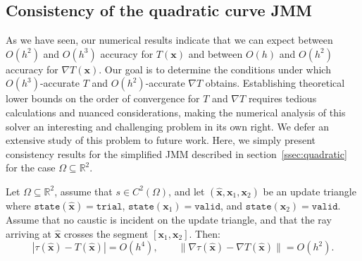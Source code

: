 \documentclass{siamart190516}
\newcommand{\m}[1]{\boldsymbol{#1}}
\newcommand{\state}{\texttt{state}}
\newcommand{\valid}{\texttt{valid}}
\newcommand{\trial}{\texttt{trial}}
\newcommand{\xhat}{\hat{\m{x}}}
\begin{document}
\subsection{Consistency of the quadratic curve JMM}

As we have seen, our numerical results indicate that we can expect
between $O(h^2)$ and $O(h^3)$ accuracy for $T(\m{x})$ and between
$O(h)$ and $O(h^2)$ accuracy for $\nabla T(\m{x})$. Our goal is to
determine the conditions under which $O(h^3)$-accurate $T$ and
$O(h^2)$-accurate $\nabla T$ obtains. Establishing theoretical lower
bounds on the order of convergence for $T$ and $\nabla T$ requires
tedious calculations and nuanced considerations, making the numerical
analysis of this solver an interesting and challenging problem in its
own right. We defer an extensive study of this problem to future
work. Here, we simply present consistency results for the simplified
JMM described in section~\ref{ssec:quadratic} for the case
$\Omega \subseteq \mathbb{R}^2$.

\begin{theorem}
  Let $\Omega \subseteq \mathbb{R}^2$, assume that
  $s \in C^2(\Omega)$, and let $(\xhat, \m{x}_1, \m{x}_2)$ be an
  update triangle where $\state(\xhat) = \trial$,
  $\state(\m{x}_1) = \valid$, and $\state(\m{x}_2) = \valid$. Assume
  that no caustic is incident on the update triangle, and that the ray
  arriving at $\xhat$ crosses the segment $[\m{x}_1, \m{x}_2]$. Then:
  \begin{equation}
    |\tau(\xhat) - T(\xhat)| = O(h^4), \qquad \|\nabla \tau(\xhat) - \nabla T(\xhat)\| = O(h^2).
  \end{equation}
\end{theorem}
\end{document}
